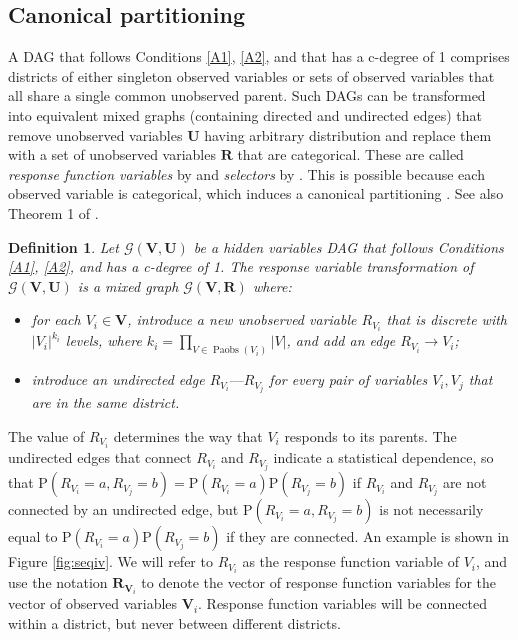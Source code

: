 \documentclass[12pt]{article}
\newtheorem{definition}{Definition}
\def\Pr{{\mathrm{P}}}
\DeclareMathOperator{\Paobs}{Paobs}
\newcommand{\bU}{\boldsymbol{U}}
\newcommand{\bV}{\boldsymbol{V}}
\newcommand{\bR}{\boldsymbol{R}}
\begin{document}
\subsection{Canonical partitioning} \label{sec:respvar}

A DAG that follows Conditions \ref{A1}, \ref{A2}, and that has a c-degree of 1 comprises districts of either singleton observed variables or sets of observed variables that all share a single common unobserved parent. Such DAGs can be transformed into equivalent mixed graphs (containing directed and undirected edges) that remove unobserved variables $\bU$ having arbitrary distribution and replace them with a set of unobserved variables $\boldsymbol{R}$ that are categorical. These are called \emph{response function variables} by \citet{balke1994counterfactual} and \emph{selectors} by \citet{bonet2001instrumentality}. This is possible because each observed variable is categorical, which induces a canonical partitioning \citep{Pearl2000causality}. See also Theorem 1 of \citet{sachs2023general}. 

\begin{definition}
Let $\mathcal{G}(\bV, \bU)$ be a hidden variables DAG that follows Conditions \ref{A1}, \ref{A2}, and has a c-degree of 1. The \emph{response variable transformation} of $\mathcal{G}(\bV, \bU)$ is a mixed graph $\mathcal{G}(\bV, \bR)$ where: 
\begin{itemize}
    \item for each $V_i \in \bV$, introduce a new unobserved variable $R_{V_i}$ that is discrete with $|V_i|^{k_i}$ levels, where $k_i = \prod_{V \in \Paobs(V_i)}|V|$, and add an edge $R_{V_i} \rightarrow V_i$; 
    \item introduce an undirected edge $R_{V_i} \text{---} R_{V_j}$ for every pair of variables $V_i, V_j$ that are in the same district.
\end{itemize}
\end{definition}

The value of $R_{V_i}$ determines the way that $V_i$ responds to its parents. The undirected edges that connect $R_{V_i}$ and $R_{V_j}$ indicate a statistical dependence, so that $\Pr(R_{V_i} = a, R_{V_j} = b) = \Pr(R_{V_i} = a)\Pr(R_{V_j} = b)$ if $R_{V_i}$ and $R_{V_j}$ are not connected by an undirected edge, but $\Pr(R_{V_i} = a, R_{V_j} = b)$ is not necessarily equal to $\Pr(R_{V_i} = a)\Pr(R_{V_j} = b)$ if they are connected. An example is shown in Figure \ref{fig:seqiv}. We will refer to $R_{V_i}$ as the response function variable of $V_i$, and use the notation $\boldsymbol{R}_{\bV_i}$ to denote the vector of response function variables for the vector of observed variables $\bV_i$. Response function variables will be connected within a district, but never between different districts. 
\end{document}
